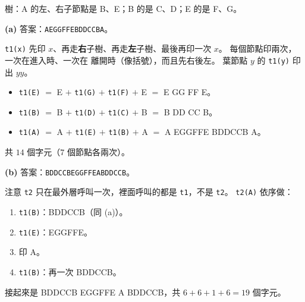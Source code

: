 \begin{pastsoln}
樹：A 的左、右子節點是 B、E；B 的是 C、D；E 的是 F、G。

\textbf{(a)} 答案：\texttt{AEGGFFEBDDCCBA}。

\texttt{t1(x)} 先印 $x$、再走\textbf{右}子樹、再走\textbf{左}子樹、最後再印一次 $x$。 每個節點印兩次，一次在進入時、一次在
離開時（像括號），而且先右後左。 葉節點 $y$ 的 \texttt{t1(y)} 印出 $yy$。
\begin{itemize}
\item \texttt{t1(E)} $=$ E $+$ \texttt{t1(G)} $+$ \texttt{t1(F)} $+$ E $=$ E GG FF E。
\item \texttt{t1(B)} $=$ B $+$ \texttt{t1(D)} $+$ \texttt{t1(C)} $+$ B $=$ B DD CC B。
\item \texttt{t1(A)} $=$ A $+$ \texttt{t1(E)} $+$ \texttt{t1(B)} $+$ A $=$ A EGGFFE BDDCCB A。
\end{itemize}
共 $14$ 個字元（$7$ 個節點各兩次）。

\textbf{(b)} 答案：\texttt{BDDCCBEGGFFEABDDCCB}。

注意 \texttt{t2} 只在最外層呼叫一次，裡面呼叫的都是 \texttt{t1}，不是 \texttt{t2}。 \texttt{t2(A)} 依序做：
\begin{enumerate}
\item \texttt{t1(B)}：BDDCCB（同 (a)）。
\item \texttt{t1(E)}：EGGFFE。
\item 印 A。
\item \texttt{t1(B)}：再一次 BDDCCB。
\end{enumerate}
接起來是 BDDCCB EGGFFE A BDDCCB，共 $6 + 6 + 1 + 6 = 19$ 個字元。
\end{pastsoln}
